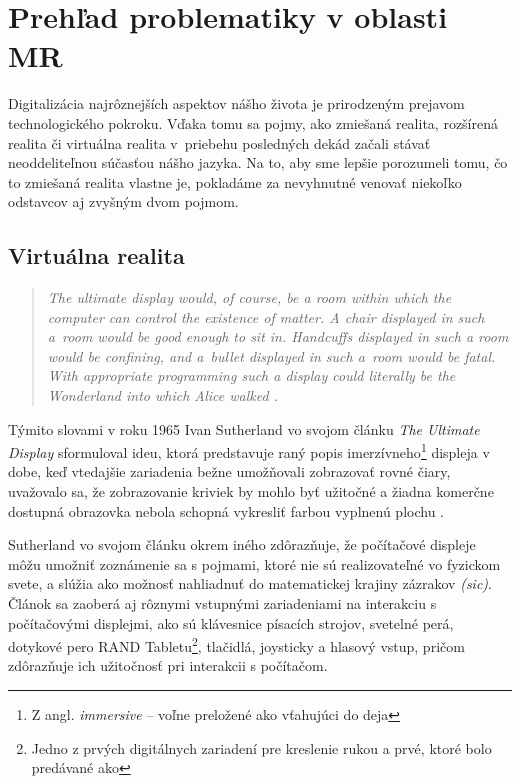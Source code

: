 \section{Prehľad problematiky v oblasti MR}
Digitalizácia najrôznejších aspektov nášho života je prirodzeným prejavom technologického pokroku. Vďaka tomu sa 
pojmy, ako zmiešaná realita, rozšírená realita či virtuálna realita v~priebehu posledných dekád začali stávať neoddeliteľnou súčasťou nášho jazyka. 
Na to, aby sme lepšie porozumeli tomu, čo to zmiešaná realita vlastne je, pokladáme za nevyhnutné venovať niekoľko odstavcov aj zvyšným dvom pojmom.

\subsection{Virtuálna realita}
\begin{quote}\itshape
  The ultimate display would, of course, be a room within which the computer can control the existence of matter. A chair displayed in such a~room 
  would be good enough to sit in. Handcuffs displayed in such a room would be confining, and a~bullet displayed in such a~room would be fatal. 
  With appropriate programming such a display could literally be the Wonderland into which Alice walked \cite{sutherlandUltimateDisplay1965b}.
\end{quote}
Týmito slovami v roku 1965 Ivan Sutherland vo svojom článku \emph{The Ultimate Display} sformuloval ideu, ktorá predstavuje raný popis 
imerzívneho\footnote{Z angl. \emph{immersive} {--} voľne preložené ako vťahujúci do deja} displeja v dobe, keď vtedajšie zariadenia bežne umožňovali 
zobrazovať rovné čiary, uvažovalo sa, že zobrazovanie kriviek by mohlo byť užitočné a žiadna komerčne dostupná obrazovka nebola schopná vykresliť farbou 
vyplnenú plochu \cite{sutherlandUltimateDisplay1965b}. 

Sutherland vo svojom článku okrem iného zdôrazňuje, že počítačové displeje môžu umožniť zoznámenie sa s pojmami, ktoré nie sú realizovateľné vo fyzickom svete, 
a slúžia ako možnosť nahliadnuť do matematickej krajiny zázrakov \emph{(sic)}. Článok sa zaoberá aj rôznymi vstupnými zariadeniami na interakciu s počítačovými 
displejmi, ako sú klávesnice písacích strojov, svetelné perá, dotykové pero RAND Tabletu\footnote{Jedno z prvých digitálnych zariadení pre kreslenie rukou a prvé, 
ktoré bolo predávané ako }, tlačidlá, joysticky a hlasový vstup, pričom zdôrazňuje ich užitočnosť pri interakcii s počítačom. 

